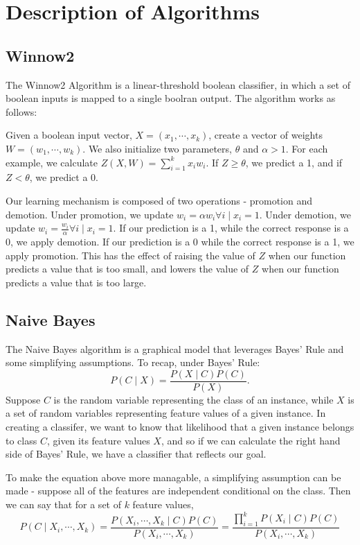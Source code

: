\documentclass{amsart}
\begin{document}
    \section{Description of Algorithms}
    \subsection*{Winnow2}
    The Winnow2 Algorithm\cite{winnow2} is a linear-threshold boolean classifier, in which a set of boolean inputs is mapped
    to a single boolran output. The algorithm works as follows:

    Given a boolean input vector, $X = (x_1, \cdots, x_k)$,  create a vector of weights $W = (w_1, \cdots, w_k)$.
    We also initialize two parameters, $\theta$ and $\alpha > 1$.
    For each example, we calculate $Z(X, W) = \sum_{i=1}^k x_i w_i$. If $Z \geq \theta$, we
    predict a 1, and if $Z < \theta$, we predict a 0.

    Our learning mechanism is composed of two operations - promotion and demotion.
    Under promotion, we update $w_i = \alpha w_i \forall i \mid x_i = 1$. Under demotion,
    we update $w_i =  \frac{w_i}{\alpha} \forall i \mid x_i = 1$. If our prediction is a 1, while
    the correct response is a 0, we apply demotion. If our prediction is a 0 while the correct
    response is a 1, we apply promotion. This has the effect of raising the value of $Z$ when our
    function predicts a value that is too small, and lowers the value of $Z$ when our
    function predicts a value that is too large.


    \subsection*{Naive Bayes}
    The Naive Bayes algorithm is a graphical model that leverages Bayes' Rule and some simplifying
    assumptions. To recap, under Bayes' Rule:
    \[
        P(C \mid X) = \frac{P(X \mid C) P(C)}{P(X)}.
    \]
    Suppose $C $ is the random variable representing the class of an instance, while $X$ is a
    set of random variables representing feature values of a given instance. In creating a classifer,
    we want to know that likelihood that a given instance belongs to class $C$, given its feature values $X$,
    and so if we can calculate the right hand side of Bayes' Rule, we have a classifier that reflects our goal.

    To make the equation above more managable, a simplifying assumption can be made - suppose all
    of the features are independent conditional on the class. Then we can say that for a set
    of $k$ feature values,
    \[
        P(C \mid X_i, \cdots, X_k ) = \frac{
            P(X_i, \cdots, X_k\mid C) P(C)
        }{P(X_i, \cdots, X_k)}
        = \frac{
            \prod_{i=1}^k P(X_i \mid C) P(C)
        }{P(X_i, \cdots, X_k)}
    \]
\end{document}
